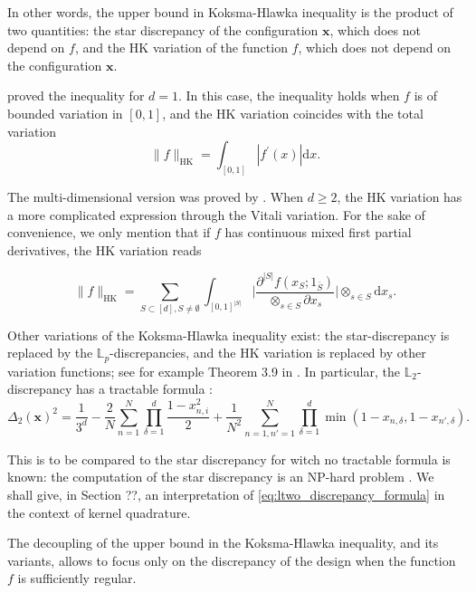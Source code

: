 \documentclass[twoside,11pt]{book}
\numberwithin{theorem}{chapter}
\numberwithin{definition}{chapter}
\numberwithin{proposition}{chapter}
\numberwithin{corollary}{chapter}
\numberwithin{example}{chapter}
\numberwithin{lemma}{chapter}
\numberwithin{assumption}{chapter}
\begin{document}
In other words, the upper bound in Koksma-Hlawka inequality is the product of two quantities: the star discrepancy of the configuration $\bm{x}$, which does not depend on $f$, and the HK variation of the function $f$, which does not depend on the configuration $\bm{x}$. 

\cite{Kok42} proved the inequality for $d=1$. In this case, the inequality holds when $f$ is of bounded variation in $[0,1]$, and the HK variation coincides with the total variation
\begin{equation}
\|f\|_{\mathrm{HK}} = \int_{[0,1]}|f^{'}(x)| \mathrm{d}x.
\end{equation}


The multi-dimensional version was proved by \cite{Hla61}. When $d \geq 2$, the HK variation has a more complicated expression through the Vitali variation. For the sake of convenience, we only mention that if $f$ has continuous mixed first partial derivatives, the HK variation reads

\begin{equation}
\|f\|_{\mathrm{HK}} = \sum\limits_{S \subset[d], S \neq \emptyset} \int_{[0,1]^{|S|}} \bigg|\frac{\partial^{|S|} f (x_S;1_{\bar{S}})}{\otimes_{s \in S}\partial x_{s}} \bigg| \otimes_{s \in S}\mathrm{d} x_{s}.
\end{equation}

Other variations of the Koksma-Hlawka inequality exist: the star-discrepancy is replaced by the $\mathbb{L}_{p}$-discrepancies, and the HK variation is replaced by other variation functions; see for example Theorem 3.9 in \citep{DiPi14}. In particular, the $\mathbb{L}_{2}$-discrepancy has a tractable formula \citep{War72}:
\begin{equation}\label{eq:ltwo_discrepancy_formula}
\Delta_{2}(\bm{x})^{2} = \frac{1}{3^{d}} - \frac{2}{N} \sum\limits_{n = 1}^{N} \prod\limits_{\delta=1}^{d} \frac{1-x_{n,i}^{2}}{2} + \frac{1}{N^2} \sum\limits_{n=1,n'=1}^{N} \prod\limits_{\delta=1}^{d} \min(1-x_{n,\delta},1-x_{n',\delta}).
\end{equation}

This is to be compared to the star discrepancy for witch no tractable formula is known: the computation of the star discrepancy is an NP-hard problem \citep{GnSrWi09}. We shall give, in Section ??, an interpretation of \eqref{eq:ltwo_discrepancy_formula} in the context of kernel quadrature.

The decoupling of the upper bound in the Koksma-Hlawka inequality, and its variants, allows to focus only on the discrepancy of the design when the function $f$ is sufficiently regular.
\end{document}
